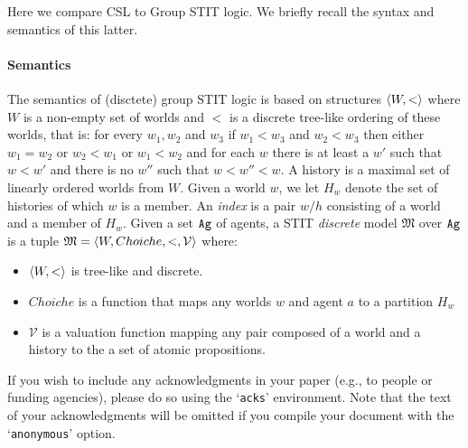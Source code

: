 \documentclass[sigconf,anonymous]{aamas}
\begin{document}
Here we compare CSL to Group STIT logic. We briefly recall the syntax and semantics of this latter. 

\paragraph{Semantics}
The semantics of (disctete) group STIT logic is based on structures $\langle W,< \rangle$ where $W$ is a non-empty set of worlds and $<$ is a discrete tree-like ordering of these worlds, that is: for every $w_1,w_2$ and $w_3$ if $w_1<w_3$ and $w_2<w_3$ then either $w_1=w_2$ or $w_2<w_1$ or $w_1<w_2$ and for each $w$ there is at least a $w'$ such that $w<w'$ and there is no $w''$ such that $w<w''<w$. A history is a maximal set of linearly ordered worlds from $W$. Given a world $w$, we let $H_w$ denote the set of histories of which $w$ is a member. An \emph{index} is a pair $w/h$ consisting of a world and a member of $H_w$. 
Given a set $\texttt{Ag}$ of agents, a STIT \emph{discrete} model $\mathfrak{M}$ over $\texttt{Ag}$ is a tuple $\mathfrak{M}=\langle W,Choiche,<,\mathcal{V} \rangle$ where:
\begin{itemize}
  \item   $\langle W,< \rangle$ is tree-like and discrete.  
    \item $Choiche$ is a function that maps any worlds $w$ and agent $a$ to a partition $H_w$
    \item $\mathcal{V}$ is a valuation function mapping any pair composed of a world and a history to the a set of atomic propositions. 
\end{itemize}







\begin{acks}
If you wish to include any acknowledgments in your paper (e.g., to 
people or funding agencies), please do so using the `\texttt{acks}' 
environment. Note that the text of your acknowledgments will be omitted
if you compile your document with the `\texttt{anonymous}' option.
\end{acks}



 


\end{document}
